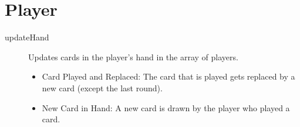 \section{Player}
\begin{description}
	\item[updateHand] Updates cards in the player's hand in the array of players.
	\begin{itemize}
		\item Card Played and Replaced: The card that is played gets replaced by a new card (except the last round).
		\item New Card in Hand: A new card is drawn by the player who played a card.		
	\end{itemize}
\end{description}
